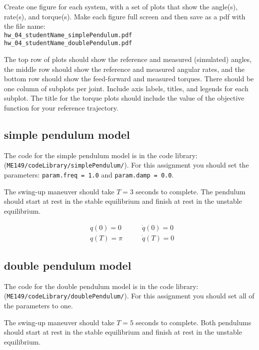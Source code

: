 Create one figure for each system, with a set of plots that show the angle(s),
rate(s), and torque(s).
Make each figure full screen and then save as a pdf with the file name:\\
\texttt{hw\_04\_studentName\_simplePendulum.pdf} \\
\texttt{hw\_04\_studentName\_doublePendulum.pdf} \\

\par
The top row of plots should show the reference and measured (simulated) angles,
the middle row should show the reference and measured angular rates,
and the bottom row should show the feed-forward and measured torques.
There should be one column of subplots per joint.
Include axis labels, titles, and legends for each subplot.
The title for the torque plots should include the value of the objective function
for your reference trajectory.

\subsection*{simple pendulum model}

The code for the simple pendulum model is in the code library:
(\texttt{ME149/codeLibrary/simplePendulum/}).
For this assignment you should set the parameters:
 \texttt{param.freq = 1.0} and \texttt{param.damp = 0.0}.

\par The swing-up maneuver should take $T = 3$ seconds to complete.
The pendulum should start at rest in the stable equilibrium
and finish at rest in the unstable equilibrium.

\begin{align}
  &q(0) = 0   \quad & \quad   \dot{q}(0) = 0 \\
  &q(T) = \pi \quad & \quad \dot{q}(T) = 0
\end{align}

\subsection*{double pendulum model}

The code for the double pendulum model is in the code library:
(\texttt{ME149/codeLibrary/doublePendulum/}).
For this assignment you should set all of the parameters to one.

\par The swing-up maneuver should take $T = 5$ seconds to complete.
Both pendulums should start at rest in the stable equilibrium
and finish at rest in the unstable equilibrium.

